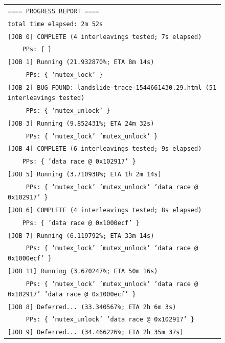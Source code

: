 \begin{figure}[t]
\begin{center}
\begin{tabular}{l}
		\texttt{==== PROGRESS REPORT ====} \\
		\texttt{total time elapsed: 2m 52s} \\
		\texttt{[JOB 0] COMPLETE (4 interleavings tested; 7s elapsed)} \\
		\texttt{~~~~PPs: \{ \}} \\
		\texttt{[JOB 1] Running (21.932870\%; ETA 8m 14s)} \\
		\texttt{~~~~ PPs: \{ 'mutex\_lock' \}} \\
		\texttt{[JOB 2] BUG FOUND: landslide-trace-1544661430.29.html (51 interleavings tested)} \\
		\texttt{~~~~ PPs: \{ 'mutex\_unlock' \}} \\
		\texttt{[JOB 3] Running (9.852431\%; ETA 24m 32s)} \\
		\texttt{~~~~ PPs: \{ 'mutex\_lock' 'mutex\_unlock' \}} \\
		\texttt{[JOB 4] COMPLETE (6 interleavings tested; 9s elapsed)} \\
		\texttt{~~~~PPs: \{ 'data race @ 0x102917' \}} \\
		\texttt{[JOB 5] Running (3.710938\%; ETA 1h 2m 14s)} \\
		\texttt{~~~~ PPs: \{ 'mutex\_lock' 'mutex\_unlock' 'data race @ 0x102917' \}} \\
		\texttt{[JOB 6] COMPLETE (4 interleavings tested; 8s elapsed)} \\
		\texttt{~~~~PPs: \{ 'data race @ 0x1000ecf' \}} \\
		\texttt{[JOB 7] Running (6.119792\%; ETA 33m 14s)} \\
		\texttt{~~~~ PPs: \{ 'mutex\_lock' 'mutex\_unlock' 'data race @ 0x1000ecf' \}} \\
		\texttt{[JOB 11] Running (3.670247\%; ETA 50m 16s)} \\
		\texttt{~~~~ PPs: \{ 'mutex\_lock' 'mutex\_unlock' 'data race @ 0x102917' 'data race @ 0x1000ecf' \}} \\
		\texttt{[JOB 8] Deferred... (33.340567\%; ETA 2h 6m 3s)} \\
		\texttt{~~~~ PPs: \{ 'mutex\_unlock' 'data race @ 0x102917' \}} \\
		\texttt{[JOB 9] Deferred... (34.466226\%; ETA 2h 35m 37s)} \\

\end{tabular}
\end{center}
\end{figure}

